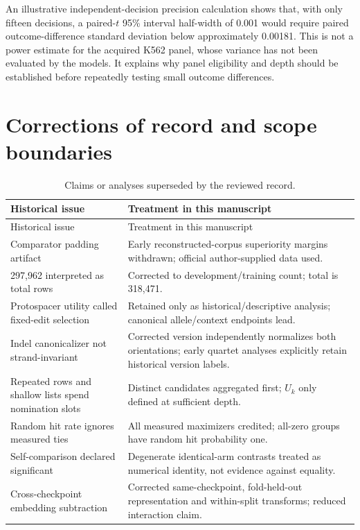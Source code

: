 An illustrative independent-decision precision calculation shows that, with only fifteen decisions, a paired-$t$ 95\% interval half-width of 0.001 would require paired outcome-difference standard deviation below approximately 0.00181. This is not a power estimate for the acquired K562 panel, whose variance has not been evaluated by the models. It explains why panel eligibility and depth should be established before repeatedly testing small outcome differences.

\section{Corrections of record and scope boundaries}
\begin{longtable}{P{.29\linewidth}P{.62\linewidth}}
\caption{Claims or analyses superseded by the reviewed record.}\label{tab:corrections}\\
\toprule Historical issue & Treatment in this manuscript \\
\midrule\endfirsthead
\toprule Historical issue & Treatment in this manuscript \\
\midrule\endhead
\bottomrule\endfoot
Comparator padding artifact & Early reconstructed-corpus superiority margins withdrawn; official author-supplied data used. \\
297,962 interpreted as total rows & Corrected to development/training count; total is 318,471. \\
Protospacer utility called fixed-edit selection & Retained only as historical/descriptive analysis; canonical allele/context endpoints lead. \\
Indel canonicalizer not strand-invariant & Corrected version independently normalizes both orientations; early quartet analyses explicitly retain historical version labels. \\
Repeated rows and shallow lists spend nomination slots & Distinct candidates aggregated first; $U_k$ only defined at sufficient depth. \\
Random hit rate ignores measured ties & All measured maximizers credited; all-zero groups have random hit probability one. \\
Self-comparison declared significant & Degenerate identical-arm contrasts treated as numerical identity, not evidence against equality. \\
Cross-checkpoint embedding subtraction & Corrected same-checkpoint, fold-held-out representation and within-split transforms; reduced interaction claim. \\

\end{longtable}
